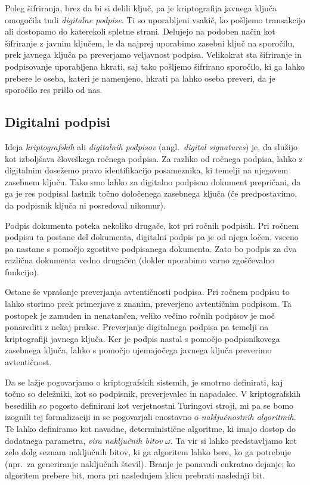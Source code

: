 Poleg šifriranja, brez da bi si delili ključ, pa je kriptografija javnega ključa omogočila tudi
\textit{digitalne podpise}. Ti so uporabljeni vsakič, ko pošljemo transakcijo ali dostopamo do katerekoli
spletne strani. Delujejo na podoben način kot šifriranje z javnim ključem, le da najprej uporabimo
zasebni ključ na sporočilu, prek javnega ključa pa preverjamo veljavnost podpisa. Velikokrat sta šifriranje
in podpisovanje uporabljena hkrati, saj tako pošljemo šifrirano sporočilo, ki ga lahko prebere le oseba,
kateri je namenjeno, hkrati pa lahko oseba preveri, da je sporočilo res prišlo od nas.

\subsection{Digitalni podpisi}
Ideja \textit{kriptografskih} ali \textit{digitalnih podpisov} (angl.\ \textit{digital signatures}) je,
da služijo kot izboljšava človeškega ročnega podpisa. Za razliko od ročnega podpisa, lahko z digitalnim
dosežemo pravo identifikacijo posameznika, ki temelji na njegovem zasebnem ključu. Tako smo lahko
za digitalno podpisan dokument prepričani, da ga je res podpisal lastnik točno določenega zasebnega ključa
(če predpostavimo, da podpisnik ključa ni posredoval nikomur).

Podpis dokumenta poteka nekoliko drugače, kot pri ročnih podpisih. Pri ročnem podpisu ta postane del
dokumenta, digitalni podpis pa je od njega ločen, vseeno pa nastane s pomočjo zgostitve podpisanega
dokumenta. Zato bo podpis za dva različna dokumenta vedno drugačen (dokler uporabimo varno zgoščevalno
funkcijo).

Ostane še vprašanje preverjanja avtentičnosti podpisa. Pri ročnem podpisu to lahko storimo prek 
primerjave z znanim, preverjeno avtentičnim podpisom. Ta postopek je zamuden in nenatančen, veliko 
večino ročnih podpisov je moč ponarediti z nekaj prakse. Preverjanje digitalnega podpisa pa temelji 
na kriptografiji javnega ključa. Ker je podpis nastal s pomočjo podpisnikovega zasebnega ključa,
lahko s pomočjo ujemajočega javnega ključa preverimo avtentičnost.

Da se lažje pogovarjamo o kriptografskih sistemih, je smotrno definirati, kaj točno so deležniki,
kot so podpisnik, preverjevalec in napadalec. V kriptografskih besedilih so pogosto definirani kot
verjetnostni Turingovi stroji, mi pa se bomo izognili tej formalizaciji in se pogovarjali enostavno
o \textit{naključnostnih algoritmih}. Te lahko definiramo kot navadne, deterministične algoritme,
ki imajo dostop do dodatnega parametra, \textit{vira naključnih bitov} $\omega$. Ta vir si lahko
predstavljamo kot zelo dolg seznam naključnih bitov, ki ga algoritem lahko bere, ko ga potrebuje
(npr.\ za generiranje naključnih števil). Branje je ponavadi enkratno dejanje; ko algoritem prebere
bit, mora pri naslednjem klicu prebrati naslednji bit.

